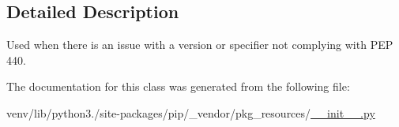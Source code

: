 \subsection{Detailed Description}
\begin{DoxyVerb}Used when there is an issue with a version or specifier not complying with
PEP 440.
\end{DoxyVerb}
 

The documentation for this class was generated from the following file\+:\begin{DoxyCompactItemize}
\item 
venv/lib/python3./site-\/packages/pip/\+\_\+vendor/pkg\+\_\+resources/\hyperlink{venv_2lib_2python3_89_2site-packages_2pip_2__vendor_2pkg__resources_2____init_____8py}{\+\_\+\+\_\+init\+\_\+\+\_\+.\+py}\end{DoxyCompactItemize}
